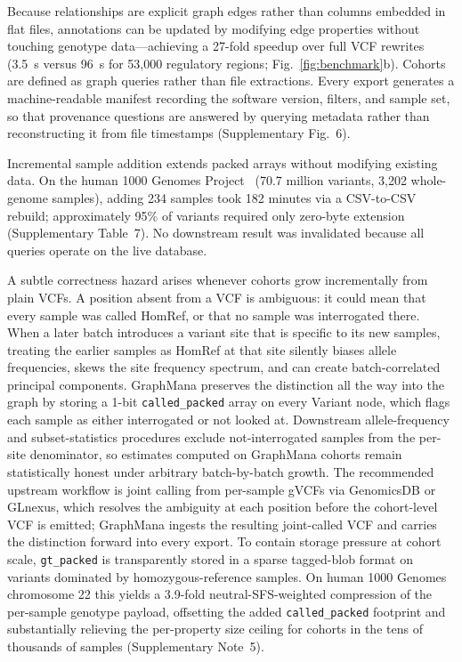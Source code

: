 \documentclass[pdflatex,sn-nature]{sn-jnl}
\begin{document}
Because relationships are explicit graph edges rather than columns embedded in flat files, annotations can be updated by modifying edge properties without touching genotype data---achieving a 27-fold speedup over full VCF rewrites (3.5~s versus 96~s for 53,000 regulatory regions; Fig.~\ref{fig:benchmark}b). Cohorts are defined as graph queries rather than file extractions. Every export generates a machine-readable manifest recording the software version, filters, and sample set, so that provenance questions are answered by querying metadata rather than reconstructing it from file timestamps (Supplementary Fig.~6).

Incremental sample addition extends packed arrays without modifying existing data. On the human 1000 Genomes Project~\cite{byrska2022} (70.7 million variants, 3,202 whole-genome samples), adding 234 samples took 182 minutes via a CSV-to-CSV rebuild; approximately 95\% of variants required only zero-byte extension (Supplementary Table~7). No downstream result was invalidated because all queries operate on the live database.

A subtle correctness hazard arises whenever cohorts grow incrementally from plain VCFs. A position absent from a VCF is ambiguous: it could mean that every sample was called HomRef, or that no sample was interrogated there. When a later batch introduces a variant site that is specific to its new samples, treating the earlier samples as HomRef at that site silently biases allele frequencies, skews the site frequency spectrum, and can create batch-correlated principal components. GraphMana preserves the distinction all the way into the graph by storing a 1-bit \texttt{called\_packed} array on every Variant node, which flags each sample as either interrogated or not looked at. Downstream allele-frequency and subset-statistics procedures exclude not-interrogated samples from the per-site denominator, so estimates computed on GraphMana cohorts remain statistically honest under arbitrary batch-by-batch growth. The recommended upstream workflow is joint calling from per-sample gVCFs via GenomicsDB or GLnexus, which resolves the ambiguity at each position before the cohort-level VCF is emitted; GraphMana ingests the resulting joint-called VCF and carries the distinction forward into every export. To contain storage pressure at cohort scale, \texttt{gt\_packed} is transparently stored in a sparse tagged-blob format on variants dominated by homozygous-reference samples. On human 1000 Genomes chromosome 22 this yields a 3.9-fold neutral-SFS-weighted compression of the per-sample genotype payload, offsetting the added \texttt{called\_packed} footprint and substantially relieving the per-property size ceiling for cohorts in the tens of thousands of samples (Supplementary Note~5).
\end{document}
